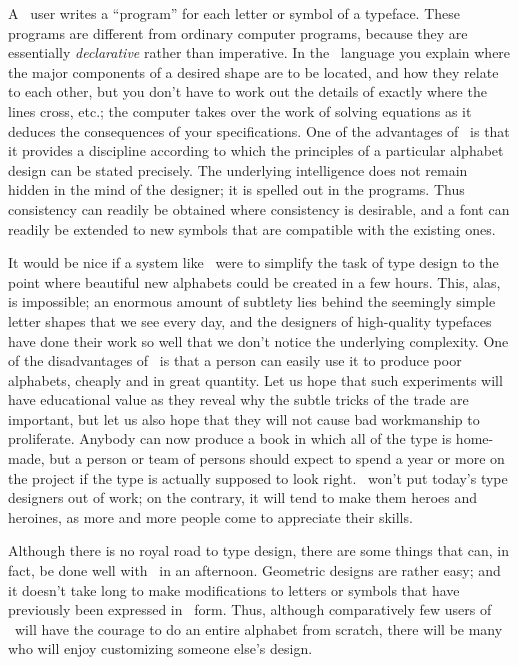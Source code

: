 {A \MF\ user writes a ``program'' for each letter or symbol of a typeface.
These programs are different from ordinary computer programs,
because they are essentially {\sl declarative\/} rather than imperative.
In the \MF\ language you explain where the major components of a
desired shape are to be located, and how they relate to each other,
but you don't have to work out the details of exactly where the lines
cross, etc.; the computer takes over the work of solving equations as it
deduces the consequences of your specifications. One of the advantages of
\MF\ is that it provides a discipline according to which the principles
of a particular alphabet design can be stated precisely. The underlying
intelligence does not remain hidden in the mind of the designer; it is
spelled out in the programs. Thus consistency can readily be obtained
where consistency is desirable, and a font can readily be extended to
new symbols that are compatible with the existing ones.

It would be nice if a system like \MF\ were to simplify the task of type
design to the point where beautiful new alphabets could be created in a
few hours. This, alas, is impossible; an enormous amount of subtlety lies
behind the seemingly simple letter shapes that we see every day, and the
designers of high-quality typefaces have done their work so well that we
don't notice the underlying complexity.  One of the disadvantages of \MF\
is that a person can easily use it to produce poor alphabets, cheaply and
in great quantity. Let us hope that such experiments will have educational
value as they reveal why the subtle tricks of the trade are important, but
let us also hope that they will not cause bad workmanship to proliferate.
Anybody can now produce a book in which all of the type is home-made, but
a person or team of persons should expect to spend a year or more on the
project if the type is actually supposed to look right. \MF\ won't put
today's type designers out of work; on the contrary, it will tend to make
them heroes and heroines, as more and more people come to appreciate their
skills.

Although there is no royal road to type design, there are some things that
can, in fact, be done well with \MF\ in an afternoon. Geometric designs
are rather easy; and it doesn't take long to make modifications to letters
or symbols that have previously been expressed in \MF\ form. Thus,
although comparatively few users of \MF\ will have the courage to do an
entire alphabet from scratch, there will be many who will enjoy
customizing someone else's design.

}
